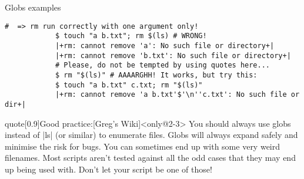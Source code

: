 \begin{frame}[fragile]{Globs examples}
\begin{onlyenv}
\begin{lstlisting}[style=MyBash, style=oddnumbers, xleftmargin=3mm, xrightmargin=3mm, firstnumber=32]
                       #  => rm run correctly with one argument only!
            $ touch "a b.txt"; rm $(ls) # WRONG!
            |+rm: cannot remove 'a': No such file or directory+|
            |+rm: cannot remove 'b.txt': No such file or directory+|
            # Please, do not be tempted by using quotes here...
            $ rm "$(ls)" # AAAARGHH! It works, but try this:
            $ touch "a b.txt" c.txt; rm "$(ls)"
            |+rm: cannot remove 'a b.txt'$'\n''c.txt': No such file or dir+|
        \end{lstlisting}
    \end{onlyenv}
    \vspace{2mm}
    \begin{varblock}{quote}[0.9\textwidth]{Good practice:}[Greg's Wiki]<only@2-3>
        You should always use globs instead of \textnormal{\bash|ls|} (or similar) to enumerate files.
        Globs will always expand safely and minimise the risk for bugs.
        You can sometimes end up with some very weird filenames.
        Most scripts aren't tested against all the odd cases that they may end up being used with.
        \alert{Don't let your script be one of those!}\\[-0.7em] ~
    \end{varblock}
\end{frame}
